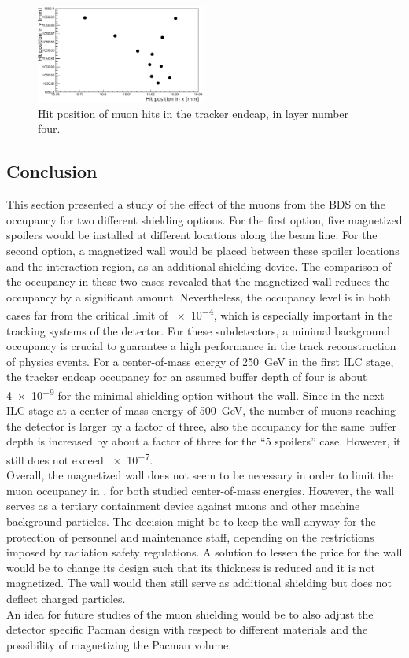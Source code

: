  \begin{figure}[htbp!]
\centering
\includegraphics[width=0.5\textwidth]{Figures/BDS_muons/LoopInACell.png}
\caption[BDS muons looping]{Hit position of muon hits in the \sid tracker endcap, in layer number four.}
\label{fig:BDS_Muons:loop}
\end{figure}

\subsection{Conclusion}
This section presented a study of the effect of the muons from the BDS on the \sid occupancy for two different shielding options.
For the first option, five magnetized spoilers would be installed at different locations along the beam line.
For the second option, a magnetized wall would be placed between these spoiler locations and the interaction region, as an additional shielding device.
The comparison of the occupancy in these two cases revealed that the magnetized wall reduces the occupancy by a significant amount.
Nevertheless, the occupancy level is in both cases far from the critical limit of \num{e-4}, which is especially important in the tracking systems of the \sid detector.
For these subdetectors, a minimal background occupancy is crucial to guarantee a high performance in the track reconstruction of physics events.
For a center-of-mass energy of \SI{250}{\GeV} in the first ILC stage, the \sid tracker endcap occupancy for an assumed buffer depth of four is about \num{4e-9} for the minimal shielding option without the wall.
Since in the next ILC stage at a center-of-mass energy of \SI{500}{\GeV}, the number of muons reaching the detector is larger by a factor of three, also the occupancy for the same buffer depth is increased by about a factor of three for the ``5 spoilers'' case.
However, it still does not exceed \num{e-7}.
\\Overall, the magnetized wall does not seem to be necessary in order to limit the muon occupancy in \sid, for both studied center-of-mass energies.
However, the wall serves as a tertiary containment device against muons and other machine background particles.
The decision might be to keep the wall anyway for the protection of personnel and maintenance staff, depending on the restrictions imposed by radiation safety regulations.
A solution to lessen the price for the wall would be to change its design such that its thickness is reduced and it is not magnetized.
The wall would then still serve as additional shielding but does not deflect charged particles. \\An idea for future studies of the muon shielding would be to also adjust the detector specific Pacman design with respect to different materials and the possibility of magnetizing the Pacman volume.


